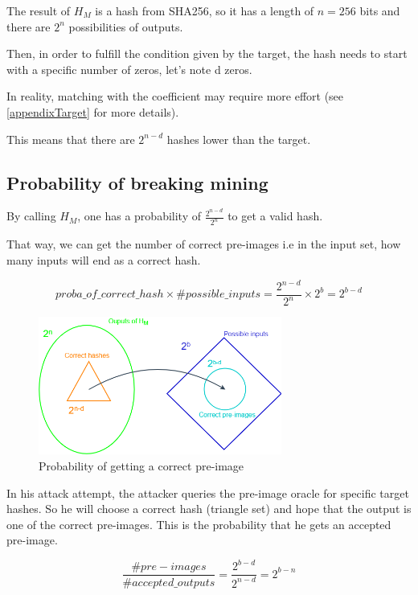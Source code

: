 The result of $H_M$ is a hash from SHA256, so it has a length of $n = 256$ bits and there are $2^n$ possibilities of outputs. \newline

Then, in order to fulfill the condition given by the target, the hash needs to start with a specific number of zeros, let's note d zeros.

In reality, matching with the coefficient may require more effort (see \ref{appendixTarget} for more details). \newline

This means that there are $2^{n-d}$ hashes lower than the target.

	\subsection{Probability of breaking mining}


By calling $H_M$, one has a probability of $\frac{2^{n-d}}{2^n}$ to get a valid hash.

That way, we can get the number of correct pre-images i.e in the input set, how many inputs will end as a correct hash.

\begin{equation}
proba\_of\_correct\_hash \times \#possible\_inputs = \frac{2^{n-d}}{2^n} \times 2^b = 2^{b-d}
\end{equation}
\newline

\begin{figure}[ht]
\centering
\includegraphics[width=8cm]{Figures/probaSuccess}
\caption{Probability of getting a correct pre-image}
\end{figure}
\medskip

In his attack attempt, the attacker queries the pre-image oracle for specific target hashes. So he will choose a correct hash (triangle set) and hope that the output is one of the correct pre-images. This is the probability that he gets an accepted pre-image.

\begin{equation}
\frac{\#pre-images}{\#accepted\_outputs} = \frac{2^{b-d}}{2^{n-d}} = 2^{b-n}
\end{equation}
\newline

